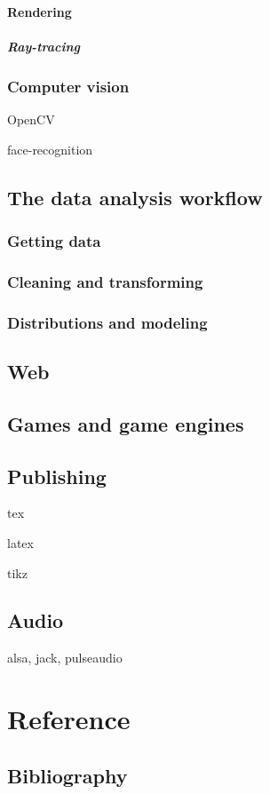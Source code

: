 \documentclass{report}
\begin{document}
\subsection{Rendering}
\subsubsection{Ray-tracing}
\section{Computer vision}
OpenCV

face-recognition

\chapter{The data analysis workflow}
\section{Getting data}
\section{Cleaning and transforming}
\section{Distributions and modeling}

\chapter{Web}
\chapter{Games and game engines}
\chapter{Publishing}
tex 

latex

tikz
\chapter{Audio}
alsa, jack, pulseaudio


\part{Reference}
\appendix
\chapter{Bibliography}
\end{document}
